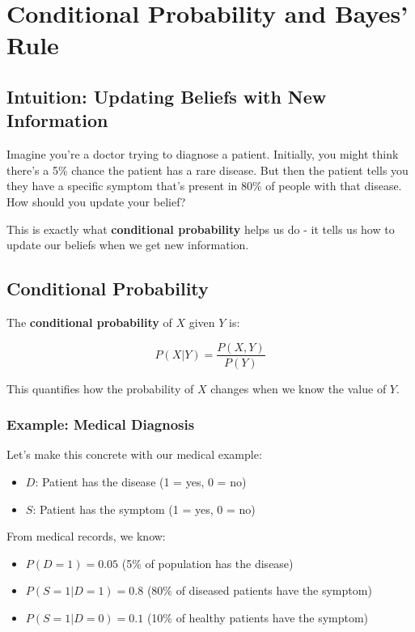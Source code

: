 
\section{Conditional Probability and Bayes' Rule}
\label{sec:conditional-probability}

\subsection{Intuition: Updating Beliefs with New Information}

Imagine you're a doctor trying to diagnose a patient. Initially, you might think there's a 5\% chance the patient has a rare disease. But then the patient tells you they have a specific symptom that's present in 80\% of people with that disease. How should you update your belief?

This is exactly what \textbf{conditional probability} helps us do - it tells us how to update our beliefs when we get new information.

\subsection{Conditional Probability}

The \textbf{conditional probability} of $X$ given $Y$ is:

\begin{equation}
P(X|Y) = \frac{P(X, Y)}{P(Y)}
\end{equation}

This quantifies how the probability of $X$ changes when we know the value of $Y$.

\subsubsection{Example: Medical Diagnosis}

Let's make this concrete with our medical example:
\begin{itemize}
    \item $D$: Patient has the disease (1 = yes, 0 = no)
    \item $S$: Patient has the symptom (1 = yes, 0 = no)
\end{itemize}

From medical records, we know:
\begin{itemize}
    \item $P(D=1) = 0.05$ (5\% of population has the disease)
    \item $P(S=1|D=1) = 0.8$ (80\% of diseased patients have the symptom)
    \item $P(S=1|D=0) = 0.1$ (10\% of healthy patients have the symptom)
\end{itemize}

